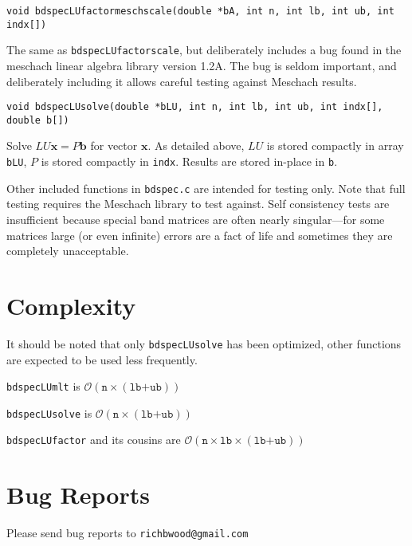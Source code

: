 \documentclass[10pt]{article}
\newcommand{\bfb}{\mathbf{b}}
\newcommand{\bfx}{\mathbf{x}}
\newcommand{\BigO}{\mathcal{O}}
\begin{document}
\texttt{void bdspecLUfactormeschscale(double *bA, int n, int lb, int ub, int indx[])}

The same as \texttt{bdspecLUfactorscale},
but deliberately includes a bug found in the meschach linear algebra library
version 1.2A. The bug is seldom important, and deliberately including it allows careful
testing against Meschach results.
\vspace{1em}

\texttt{void bdspecLUsolve(double *bLU, int n, int lb, int ub, int indx[], double b[])}

Solve $LU\bfx = P\bfb$ for vector $\bfx$. As detailed above, $LU$ is stored
compactly in array \texttt{bLU}, $P$ is stored compactly in \texttt{indx}.
Results are stored in-place in \texttt{b}.

\vspace{1em}

Other included functions in \texttt{bdspec.c} are intended for testing only.
Note that full testing requires the Meschach library to test against.  Self
consistency tests are insufficient because special band matrices are
often nearly singular---for some matrices large (or even infinite) errors are
a fact of life and sometimes they are completely unacceptable.

\section{Complexity}

It should be noted that only \texttt{bdspecLUsolve} has been optimized, other
functions are expected to be used less frequently.

\texttt{bdspecLUmlt} is $\BigO\left(\texttt{n}\times(\texttt{lb+ub})\right)$

\texttt{bdspecLUsolve} is $\BigO\left(\texttt{n}\times(\texttt{lb+ub})\right)$

\texttt{bdspecLUfactor} and its cousins are 
$\BigO\left(\texttt{n}\times\texttt{lb}\times(\texttt{lb+ub})\right)$

\section{Bug Reports}

Please send bug reports to \texttt{richbwood@gmail.com}
\end{document}
